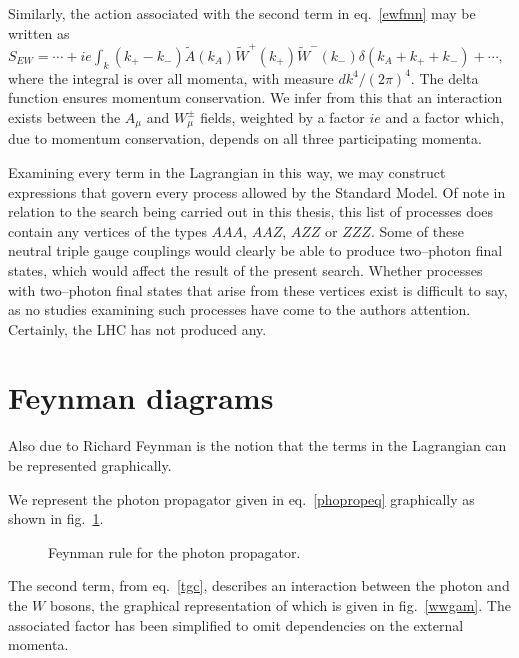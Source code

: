 Similarly, the action associated with the second term in eq.~\eqref{ewfmn} may be written as
\(S_\textit{EW}=\cdots+ie\int_k (k_{+}-k_{-})\tilde A(k_A)\tilde W^{+}(k_{+})\tilde W^{-}(k_{-})\delta(k_A+k_{+}+k_{-})+\cdots,\label{tgc}\)
where the integral is over all momenta, with measure $dk^4/(2\pi)^4$. The delta function ensures momentum conservation. We infer from this that an interaction exists between the $A_\mu$ and $W^\pm_\mu$ fields, weighted by a factor $ie$ and a factor which, due to momentum conservation, depends on all three participating momenta.

Examining every term in the Lagrangian in this way, we may construct expressions that govern every process allowed by the Standard Model. Of note in relation to the search being carried out in this thesis, this list of processes does contain any vertices of the types $AAA$, $AAZ$, $AZZ$ or $ZZZ$. Some of these neutral triple gauge couplings would clearly be able to produce two--photon final states, which would affect the result of the present search. Whether processes with two--photon final states that arise from these vertices exist is difficult to say, as no studies examining such processes have come to the authors attention. Certainly, the LHC has not produced any. 

\section{Feynman diagrams}
Also due to Richard Feynman is the notion that the terms in the Lagrangian can be represented graphically.

We represent the photon propagator given in eq.~\eqref{phopropeq} graphically as shown in fig.~\ref{phoprop}.

\begin{figure}[hbtp]
\begin{minipage}[c]{.69\textwidth}\centering\footnotesize
{}
\end{minipage}\hfill
\begin{minipage}[c]{.3\textwidth}
\caption{Feynman rule for the photon propagator.}
\label{phoprop}
\end{minipage}
\end{figure}

The second term, from eq.~\eqref{tgc}, describes an interaction between the photon and the $W$ bosons, the graphical representation of which is given in fig.~\ref{wwgam}. The associated factor has been simplified to omit dependencies on the external momenta.

